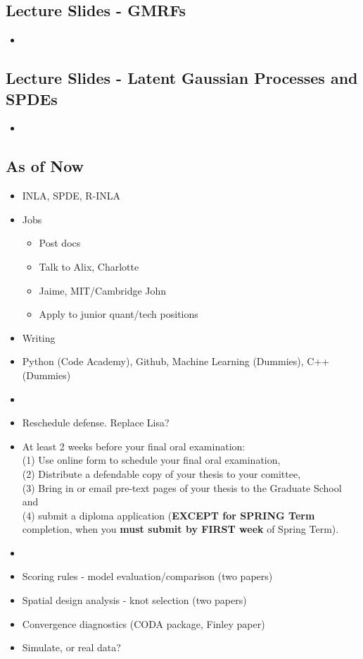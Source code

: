 \documentclass{article}
\begin{document}
\subsection*{Lecture Slides - GMRFs}
\citep{Lindstrom2014}
\begin{itemize}
\item
\end{itemize}

\subsection*{Lecture Slides - Latent Gaussian Processes and SPDEs}
\citep{Lindstrom2016}
\begin{itemize}
\item
\end{itemize}
  
\subsection*{As of Now}
\begin{itemize}
\item INLA, SPDE, R-INLA
\item Jobs
  \begin{itemize}
  \item Post docs
  \item Talk to Alix, Charlotte
  \item Jaime, MIT/Cambridge John
  \item Apply to junior quant/tech positions
  \end{itemize}
\item Writing
\item Python (Code Academy), Github, Machine Learning (Dummies), C++ (Dummies)
\item
\item Reschedule defense. Replace Lisa?
\item At least 2 weeks before your final oral examination: \\
(1) Use online form to schedule your final oral examination, \\ 
(2) Distribute a defendable copy of your thesis to your comittee, \\
(3) Bring in or email pre-text pages of your thesis to the Graduate School and \\ 
(4) submit a diploma application ({\bf EXCEPT for SPRING Term} completion, when
you {\bf must submit by FIRST week} of Spring Term).
\item 
\item Scoring rules - model evaluation/comparison (two papers)
\item Spatial design analysis - knot selection (two papers)
\item Convergence diagnostics (CODA package, Finley paper)
\item Simulate, or real data?
\end{itemize}

% 

\end{document}
